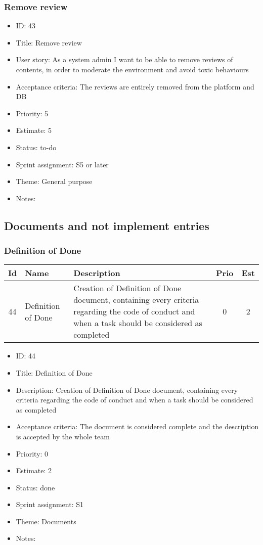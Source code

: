\subsubsection{Remove review}
\begin{itemize}
	\item ID: 43
	\item Title: Remove review
	\item User story: As a system admin I want to be able to remove reviews of contents, in order to moderate the environment and avoid toxic behaviours
	\item Acceptance criteria: The reviews are entirely removed from the platform and DB
	\item Priority: 5
	\item Estimate: 5
	\item Status: to-do
	\item Sprint assignment: S5 or later
	\item Theme: General purpose
	\item Notes:
\end{itemize}


\newpage
\subsection{Documents and not implement entries}
\subsubsection{Definition of Done}
\begin{tabular}{|c|m{1.5cm}|m{4cm}|c|c|}
	\hline
	\textbf{Id}&\textbf{Name}&\textbf{Description}&\textbf{Prio}&\textbf{Est}\\
	\hline
	44 & Definition of Done & 
	Creation of Definition of Done document, containing every criteria regarding the code of conduct and when a task should be considered as completed &
	0 & 2 \\
	\hline
\end{tabular}
\begin{itemize}
	\item ID: 44
	\item Title: Definition of Done
	\item Description: Creation of Definition of Done document, containing every criteria regarding the code of conduct and when a task should be considered as completed
	\item Acceptance criteria: The document is considered complete and the description is accepted by the whole team
	\item Priority: 0
	\item Estimate: 2
	\item Status: done
	\item Sprint assignment: S1
	\item Theme: Documents
	\item Notes:
\end{itemize}

